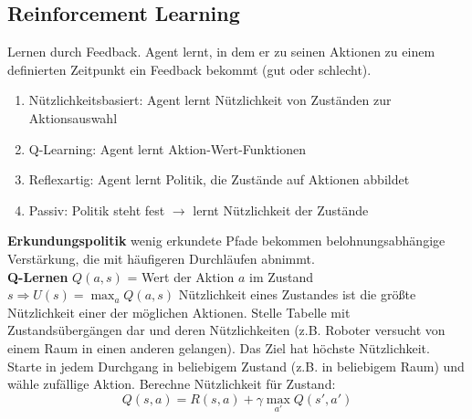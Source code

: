 \documentclass[12pt]{article}
\begin{document}
	\subsection{Reinforcement Learning}
	Lernen durch Feedback. Agent lernt, in dem er zu seinen Aktionen zu einem definierten Zeitpunkt ein Feedback bekommt (gut oder schlecht).
	\begin{enumerate}
		\item Nützlichkeitsbasiert: Agent lernt Nützlichkeit von Zuständen zur Aktionsauswahl
		\item Q-Learning: Agent lernt Aktion-Wert-Funktionen
		\item Reflexartig: Agent lernt Politik, die Zustände auf Aktionen abbildet
		\item Passiv: Politik steht fest $\rightarrow$ lernt Nützlichkeit der Zustände
	\end{enumerate}
	\textbf{Erkundungspolitik} wenig erkundete Pfade bekommen belohnungsabhängige Verstärkung, die mit häufigeren Durchläufen abnimmt.\\
	\textbf{Q-Lernen} $Q(a,s)$ = Wert der Aktion $a$ im Zustand $s \Rightarrow U(s) = \max_a Q(a,s)$ Nützlichkeit eines Zustandes ist die größte Nützlichkeit einer der möglichen Aktionen. Stelle Tabelle mit Zustandsübergängen dar und deren Nützlichkeiten (z.B. Roboter versucht von einem Raum in einen anderen gelangen). Das Ziel hat höchste Nützlichkeit. Starte in jedem Durchgang in beliebigem Zustand (z.B. in beliebigem Raum) und wähle zufällige Aktion. Berechne Nützlichkeit für Zustand:
	$$Q(s,a) = R(s,a) + \gamma \max_{a'} Q(s',a')$$
	
\end{document}
